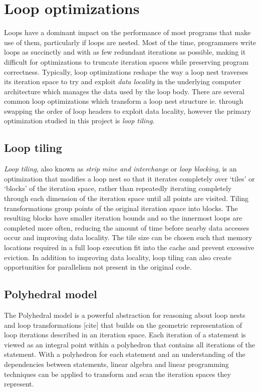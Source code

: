 \documentclass[a4paper,12pt,twoside]{report}
\begin{document}
\section{Loop optimizations}
Loops have a dominant impact on the performance of most programs that make use of them, particularly if loops are nested.
Most of the time, programmers write loops as succinctly and with as few redundant iterations as possible, making it difficult
for optimizations to truncate iteration spaces while preserving program correctness. Typically, loop optimizations reshape the
way a loop nest traverses its iteration space to try and exploit \textit{data locality} in the underlying computer architecture which
manages the data used by the loop body. There are several common loop optimizations which transform a loop nest structure ie. through
swapping the order of loop headers to exploit data locality, however the primary optimization studied in this project is \textit{loop tiling}.

\subsection{Loop tiling}
\textit{Loop tiling}, also known as \textit{strip mine and interchange} or \textit{loop blocking}, is an optimization that modifies 
a loop nest so that it iterates completely over `tiles' or `blocks' of the iteration space, rather than repeatedly iterating 
completely through each dimension of the iteration space until all points are visited. Tiling transformations group points of
the original iteration space into blocks. The resulting blocks have smaller iteration bounds and so the innermost loops are completed more often,
reducing the amount of time before nearby data accesses occur and improving data locality. The tile size can be chosen such that memory locations
required in a full loop execution fit into the cache and prevent excessive eviction. In addition to improving data locality, loop tiling can also 
create opportunities for parallelism not present in the original code.

\subsection{Polyhedral model}
The Polyhedral model is a powerful abstraction for reasoning about loop nests and loop transformations [cite] that builds on the
geometric representation of loop iterations described in an iteration space. Each iteration of a statement is viewed as an
integral point within a polyhedron that contains all iterations of the statement. With a polyhedron for each statement and an understanding
of the dependencies between statements, linear algebra and linear programming techniques can be applied to transform and scan
the iteration spaces they represent.
\end{document}

